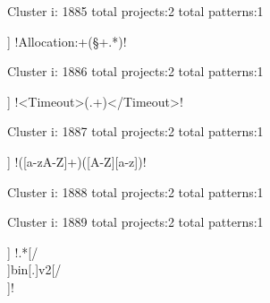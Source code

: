 Cluster i: 1885
total projects:2
total patterns:1
\begin{multicols}{1}
\begin{description}[noitemsep,topsep=0pt]
\item [[2] ] \cverb!Allocation:\s+(\S+.*)!
\end{description}
\end{multicols}







Cluster i: 1886
total projects:2
total patterns:1
\begin{multicols}{1}
\begin{description}[noitemsep,topsep=0pt]
\item [[2] ] \cverb!<Timeout>(.+)</Timeout>!
\end{description}
\end{multicols}







Cluster i: 1887
total projects:2
total patterns:1
\begin{multicols}{1}
\begin{description}[noitemsep,topsep=0pt]
\item [[2] ] \cverb!([a-zA-Z]+)([A-Z][a-z])!
\end{description}
\end{multicols}







Cluster i: 1888
total projects:2
total patterns:1
\begin{multicols}{1}
\end{multicols}







Cluster i: 1889
total projects:2
total patterns:1
\begin{multicols}{1}
\begin{description}[noitemsep,topsep=0pt]
\item [[2] ] \cverb!.*[/\\]bin[.]v2[/\\]!
\end{description}
\end{multicols}







